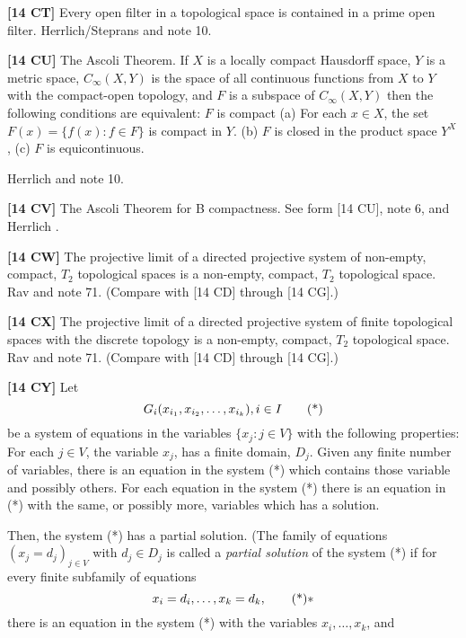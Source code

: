 \smallskip
\item{}{\bf [14 CT]} Every open filter in a topological space is
contained in a prime open filter. \ac{Herrlich/Steprans} \cite{1997}
and note 10.
\smallskip
\item{}{\bf [14 CU]} The Ascoli Theorem. If $X$ is a locally compact
Hausdorff space, $Y$ is a metric space, $C_\infty(X,Y)$ is the space
of all continuous functions from $X$ to $Y$ with the compact-open
topology, and $F$ is a subspace of $C_\infty(X,Y)$ then the following
conditions are equivalent:
 $F$ is compact
 (a) For each $x\in X$, the set $F(x) =\{f(x): f\in F\}$
is compact in $Y$.
\itemitem{}(b) $F$ is closed in the product space $Y^X$,
\itemitem{}(c) $F$ is equicontinuous.
\par \ac{Herrlich} \cite{1997b} and note 10.
\smallskip
\item{}{\bf [14 CV]} The Ascoli Theorem for B compactness. See form
[14 CU], note 6, and \ac{Herrlich} \cite{1997b}.
\smallskip
\item{}{\bf [14 CW]} The projective limit of a directed projective system
of non-empty, compact, $T_2$ topological spaces is a non-empty, compact,
$T_2$ topological space.  \ac{Rav} \cite{1976} and note 71. (Compare
with [14 CD] through [14 CG].)
\smallskip
\item{}{\bf [14 CX]} The projective limit of a directed projective system
of finite topological spaces with the discrete topology is a non-empty,
compact, $T_2$ topological space.  \ac{Rav} \cite{1976} and note 71.
(Compare with [14 CD] through [14 CG].)
\smallskip
\item{}{\bf [14 CY]} Let
$$G_i(x_{i_1}, x_{i_2}, \ldots, x_{i_k}), i\in I\tag* $$
be a system of equations in the variables $\{x_j: j\in V\}$
with the following properties:
 For each $j\in V$, the variable $x_j$, has a finite domain,
$D_j$.
 Given any finite number of variables, there is an equation
in the system (*) which contains those variable and possibly others.
 For each equation in the system (*) there is an equation in
(*) with the same, or possibly more, variables which has a solution.
\smallskip
\item{}Then, the system (*) has a partial solution. (The family of equations
$(x_j=d_j)_{j\in V}$ with $d_j\in D_j$ is called a {\it partial
solution} of the system (*) if for every finite subfamily of equations
$$x_i = d_i, \ldots, x_k = d_k,\tag**$$ there is
an equation in the system (*) with the variables $x_i, \ldots, x_k$, and
